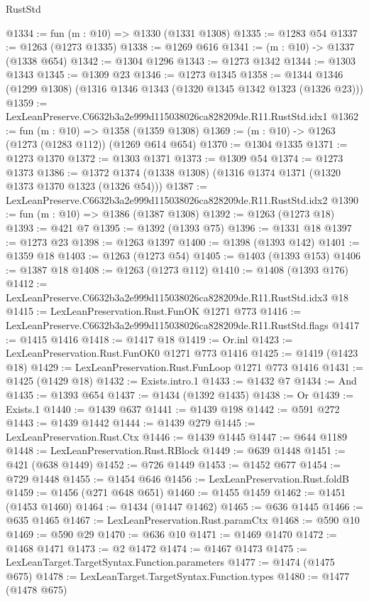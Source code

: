 \begin{lexlean}{RustStd}
\begin{coremodule}
@1334 := fun (m : @10) => @1330 (@1331 @1308)
@1335 := @1283 @54
@1337 := @1263 (@1273 @1335)
@1338 := @1269 @616
@1341 := (m : @10) -> @1337 (@1338 @654)
@1342 := @1304 @1296
@1343 := @1273 @1342
@1344 := @1303 @1343
@1345 := @1309 @23
@1346 := @1273 @1345
@1358 := @1344 @1346 (@1299 @1308) (@1316 @1346 @1343 (@1320 @1345 @1342 @1323 (@1326 @23)))
@1359 := LexLeanPreserve.C6632b3a2e999d115038026ca828209de.R11.RustStd.idx1
@1362 := fun (m : @10) => @1358 (@1359 @1308)
@1369 := (m : @10) -> @1263 (@1273 (@1283 @112)) (@1269 @614 @654)
@1370 := @1304 @1335
@1371 := @1273 @1370
@1372 := @1303 @1371
@1373 := @1309 @54
@1374 := @1273 @1373
@1386 := @1372 @1374 (@1338 @1308) (@1316 @1374 @1371 (@1320 @1373 @1370 @1323 (@1326 @54)))
@1387 := LexLeanPreserve.C6632b3a2e999d115038026ca828209de.R11.RustStd.idx2
@1390 := fun (m : @10) => @1386 (@1387 @1308)
@1392 := @1263 (@1273 @18)
@1393 := @421 @7
@1395 := @1392 (@1393 @75)
@1396 := @1331 @18
@1397 := @1273 @23
@1398 := @1263 @1397
@1400 := @1398 (@1393 @142)
@1401 := @1359 @18
@1403 := @1263 (@1273 @54)
@1405 := @1403 (@1393 @153)
@1406 := @1387 @18
@1408 := @1263 (@1273 @112)
@1410 := @1408 (@1393 @176)
@1412 := LexLeanPreserve.C6632b3a2e999d115038026ca828209de.R11.RustStd.idx3 @18
@1415 := LexLeanPreservation.Rust.FunOK @1271 @773
@1416 := LexLeanPreserve.C6632b3a2e999d115038026ca828209de.R11.RustStd.flags
@1417 := @1415 @1416
@1418 := @1417 @18
@1419 := Or.inl
@1423 := LexLeanPreservation.Rust.FunOK0 @1271 @773 @1416
@1425 := @1419 (@1423 @18)
@1429 := LexLeanPreservation.Rust.FunLoop @1271 @773 @1416
@1431 := @1425 (@1429 @18)
@1432 := Exists.intro.{1}
@1433 := @1432 @7
@1434 := And
@1435 := @1393 @654
@1437 := @1434 (@1392 @1435)
@1438 := Or
@1439 := Exists.{1}
@1440 := @1439 @637
@1441 := @1439 @198
@1442 := @591 @272
@1443 := @1439 @1442
@1444 := @1439 @279
@1445 := LexLeanPreservation.Rust.Ctx
@1446 := @1439 @1445
@1447 := @644 @1189
@1448 := LexLeanPreservation.Rust.RBlock
@1449 := @639 @1448
@1451 := @421 (@638 @1449)
@1452 := @726 @1449
@1453 := @1452 @677
@1454 := @729 @1448
@1455 := @1454 @646
@1456 := LexLeanPreservation.Rust.foldB
@1459 := @1456 (@271 @648 @651)
@1460 := @1455 @1459
@1462 := @1451 (@1453 @1460)
@1464 := @1434 (@1447 @1462)
@1465 := @636 @1445
@1466 := @635 @1465
@1467 := LexLeanPreservation.Rust.paramCtx
@1468 := @590 @10
@1469 := @590 @29
@1470 := @636 @10
@1471 := @1469 @1470
@1472 := @1468 @1471
@1473 := @2 @1472
@1474 := @1467 @1473
@1475 := LexLeanTarget.TargetSyntax.Function.parameters
@1477 := @1474 (@1475 @675)
@1478 := LexLeanTarget.TargetSyntax.Function.types
@1480 := @1477 (@1478 @675)

\end{coremodule}
\end{lexlean}
